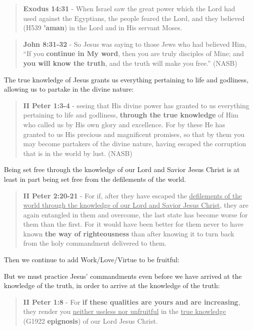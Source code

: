 \documentclass[11pt]{article}
\begin{document}
\begin{quote}
\textbf{Exodus 14:31} - When Israel saw the great power which the Lord had used against the Egyptians, the people feared the Lord, and they believed (H539 \textbf{'aman}) in the Lord and in His servant Moses.
\end{quote}

\begin{quote}
\textbf{John 8:31-32} - So Jesus was saying to those Jews who had believed Him, “If you \textbf{continue in My word}, then you are truly disciples of Mine; and \textbf{you will know the truth}, and the truth will make you free.” (NASB)
\end{quote}

The true knowledge of Jesus grants us everything pertaining to life and godliness, allowing us to partake in the divine nature:

\begin{quote}
\textbf{II Peter 1:3-4} - seeing that His divine power has granted to us everything pertaining to life and godliness, \textbf{through the true knowledge} of Him who called us by His own glory and excellence. For by these He has granted to us His precious and magnificent promises, so that by them you may become partakers of the divine nature, having escaped the corruption that is in the world by lust. (NASB)
\end{quote}

Being set free through the knowledge of our Lord and Savior Jesus Christ is at least in part being set free from the defilements of the world.

\begin{quote}
\textbf{II Peter 2:20-21} - For if, after they have escaped the \uline{defilements of the world through the knowledge of our Lord and Savior Jesus Christ}, they are again entangled in them and overcome, the last state has become worse for them than the first. For it would have been better for them never to have known \textbf{the way of righteousness} than after knowing it to turn back from the holy commandment delivered to them.
\end{quote}

Then we continue to add Work/Love/Virtue to be fruitful:

But we must practice Jesus' commandments even before we have arrived at the knowledge of the truth, in order to arrive at the knowledge of the truth:

\begin{quote}
\textbf{II Peter 1:8} - For \textbf{if these qualities are yours and are increasing}, they render you \uline{neither useless nor unfruitful} in the \uline{true knowledge} (G1922 \textbf{epignosis}) of our Lord Jesus Christ.
\end{quote}
\end{document}
